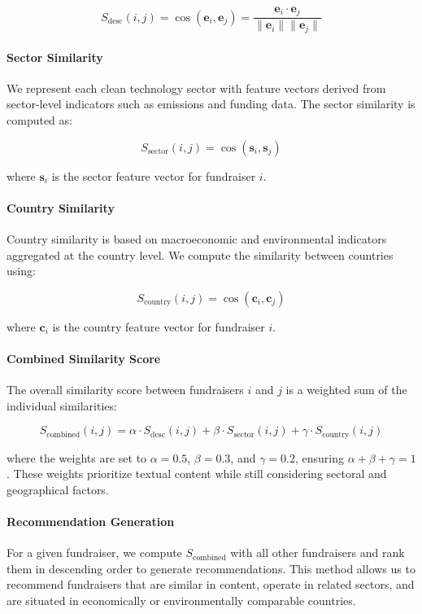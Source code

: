 \documentclass[sigconf]{acmart}
\begin{document}
\[
S_{\text{desc}}(i, j) = \cos(\mathbf{e}_i, \mathbf{e}_j) = \frac{\mathbf{e}_i \cdot \mathbf{e}_j}{\|\mathbf{e}_i\| \|\mathbf{e}_j\|}
\]

\paragraph{Sector Similarity}

We represent each clean technology sector with feature vectors derived from sector-level indicators such as emissions and funding data. The sector similarity is computed as:

\[
S_{\text{sector}}(i, j) = \cos(\mathbf{s}_i, \mathbf{s}_j)
\]

where $\mathbf{s}_i$ is the sector feature vector for fundraiser $i$.

\paragraph{Country Similarity}

Country similarity is based on macroeconomic and environmental indicators aggregated at the country level. We compute the similarity between countries using:

\[
S_{\text{country}}(i, j) = \cos(\mathbf{c}_i, \mathbf{c}_j)
\]

where $\mathbf{c}_i$ is the country feature vector for fundraiser $i$.

\paragraph{Combined Similarity Score}

The overall similarity score between fundraisers $i$ and $j$ is a weighted sum of the individual similarities:

\[
S_{\text{combined}}(i, j) = \alpha \cdot S_{\text{desc}}(i, j) + \beta \cdot S_{\text{sector}}(i, j) + \gamma \cdot S_{\text{country}}(i, j)
\]

where the weights are set to $\alpha = 0.5$, $\beta = 0.3$, and $\gamma = 0.2$, ensuring $\alpha + \beta + \gamma = 1$. These weights prioritize textual content while still considering sectoral and geographical factors.

\paragraph{Recommendation Generation}

For a given fundraiser, we compute $S_{\text{combined}}$ with all other fundraisers and rank them in descending order to generate recommendations. This method allows us to recommend fundraisers that are similar in content, operate in related sectors, and are situated in economically or environmentally comparable countries.
\end{document}
